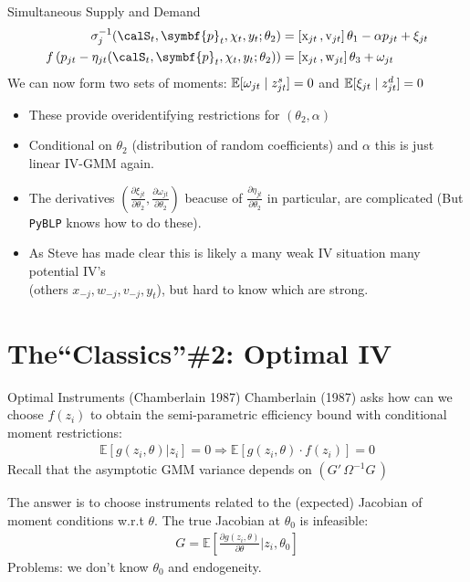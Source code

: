 \begin{frame}{Simultaneous Supply and Demand}
\begin{align*}
\sigma_j^{-1}(\calS_t,\symbf{p}_t,\chi_t, y_t; \theta_2) &= [\mathrm{x}_{jt} \,,  \mathrm{v}_{jt}]\, \theta_1 - \alpha p_{jt} + \xi_{jt}\\
f\left(p_{jt}- \eta_{jt}(\calS_t,\symbf{p}_t,\chi_t, y_t ;\theta_2)  \right) &= [\mathrm{x}_{jt} \,, \mathrm{w}_{jt}]\, \theta_3 +  \omega_{jt}
\end{align*}
We can now form two sets of moments: $\mathbb{E}[\omega_{jt} \mid  z_{jt}^{s}]=0$ and $\mathbb{E}[\xi_{jt} \mid  z_{jt}^{d}]=0$
\begin{itemize}
    \item These provide \alert{overidentifying restrictions} for $(\theta_2, \alpha)$
     \item Conditional on $\theta_2$ (distribution of random coefficients) and $\alpha$ this is just linear IV-GMM again.
     \item The derivatives $\left(\frac{\partial \xi_{jt}}{\partial \theta_2}, \frac{\partial \omega_{jt}}{\partial \theta_2} \right)$ beacuse of $\frac{\partial \eta_{jt}}{\partial \theta_2}$ in particular, are complicated (But \texttt{PyBLP} knows how to do these).
     \item As Steve has made clear this is likely a \alert{many weak IV} situation many potential IV's\\
      (others $x_{-j},w_{-j},v_{-j},y_t$), but hard to know which are strong.
\end{itemize}
\end{frame}


\section*{The``Classics''\#2: Optimal IV}

\begin{frame}{Optimal Instruments (Chamberlain 1987)}
Chamberlain (1987) asks how can we choose $f(z_i)$ to obtain the semi-parametric efficiency bound with conditional moment restrictions:
\begin{align*}
\mathbb{E}[g(z_i,\theta) | z_i]=0 \Rightarrow \mathbb{E}[g(z_i,\theta) \cdot f(z_i) ]=0 
\end{align*}
Recall that the asymptotic GMM variance depends on $(G'\, \Omega^{-1} G\,)$

The answer is to choose instruments related to the (expected) Jacobian of moment conditions w.r.t $\theta$. The true Jacobian at $\theta_0$ is \alert{infeasible}:
\begin{align*}
G=\mathbb{E}\left[\frac{\partial g(z_i,\theta)}{\partial \theta} | z_i, \theta_0 \right]
\end{align*}
Problems: we don't know $\theta_0$ and endogeneity.
\end{frame}

